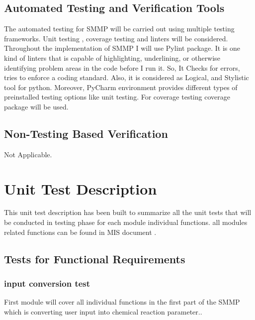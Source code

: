 \documentclass[12pt, titlepage]{article}
\begin{document}
\subsection{Automated Testing and Verification Tools}

The automated testing for SMMP will be carried out using multiple testing frameworks. Unit testing , coverage testing and linters will be considered. Throughout the implementation of SMMP I will use Pylint package. It is one kind of linters that is capable of highlighting, underlining, or otherwise identifying problem areas in the code before I run it. So, It Checks for errors, tries to enforce a coding standard. Also, it is considered as Logical, and Stylistic tool for python. Moreover, PyCharm environment provides  different types of preinstalled testing options like unit testing. For coverage testing coverage package will be used.



\subsection{Non-Testing Based Verification}

Not Applicable. 


\section{Unit Test Description}

This unit test description has been built to summarize all the unit tests that will be conducted in testing phase for each module individual functions. all modules related functions can be found in MIS document .

\subsection{Tests for Functional Requirements}

\subsubsection{input conversion test}

 First module will cover all individual functions in the first part of the SMMP which is converting user input into chemical reaction parameter.. 
\end{document}
